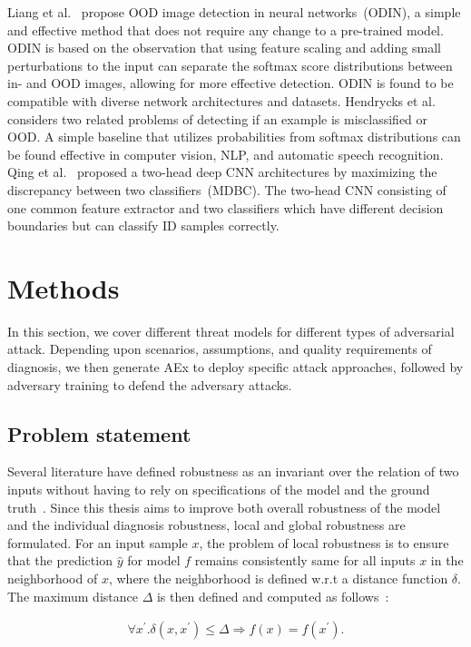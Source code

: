 \hspace*{3.5mm} Liang et al.~\cite{OOD13} propose OOD image detection in neural networks~(ODIN), a simple and effective method that does not require any change to a pre-trained model. ODIN is based on the observation that using feature scaling and adding small perturbations to the input can separate the softmax score distributions between in- and OOD images, allowing for more effective detection. ODIN is found to be compatible with diverse network architectures and datasets. Hendrycks et al.~\cite{OOD17} considers two related problems of detecting if an example is misclassified or OOD. A simple baseline that utilizes probabilities from softmax distributions can be found effective in computer vision, NLP, and automatic speech recognition. Qing et al.~\cite{OOD19} proposed a two-head deep CNN architectures by maximizing the discrepancy between two classifiers~(MDBC). The two-head CNN consisting of one common feature extractor and two classifiers which have different decision boundaries but can classify ID samples correctly. 

\section{Methods}\label{chapter_6:mm}
In this section, we cover different threat models for different types of adversarial attack. Depending upon scenarios, assumptions, and quality requirements of diagnosis, we then generate AEx to deploy specific attack approaches, followed by adversary training to defend the adversary attacks. 

\subsection{Problem statement}
Several literature have defined robustness as an invariant over the relation of two inputs without having to rely on specifications of the model and the ground truth~\cite{RobustnessNotEnough}. Since this thesis aims to improve both overall robustness of the model and the individual diagnosis robustness, local and global robustness are formulated. For an input sample $x$, the problem of local robustness is to ensure that the prediction $\hat y$ for model $f$ remains consistently same for all inputs $x$ in the neighborhood of $x$, where the neighborhood is defined w.r.t a distance function $\delta$. The maximum distance $\Delta$ is then defined and computed as follows~\cite{RobustnessNotEnough}:

\begin{align}
    \forall x^{\prime}. \delta\left(x, x^{\prime}\right) \leq \Delta \Rightarrow f(x)=f\left(x^{\prime}\right). 
\end{align}

